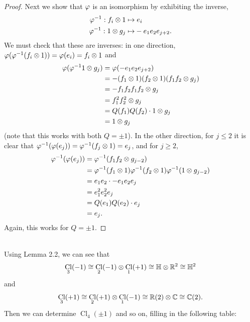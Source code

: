\documentclass{amsart}
\DeclareMathOperator{\Cl}{\mathrm{Cl}}
\begin{document}
\begin{proof}
		Next we show that $\varphi$ is an isomorphism by exhibiting the inverse,
		\begin{align*}
		\varphi^{-1}: f_i\otimes 1 \mapsto& \; e_i\\
		\varphi^{-1}: 1 \otimes g_j \mapsto& -e_1e_2e_{j+2}.
		\end{align*}
		We must check that these are inverses: in one direction, $\varphi(\varphi^{-1}(f_i\otimes 1)) = \varphi(e_i) = f_i\otimes 1$ and
\begin{align*}
	\varphi(\varphi^{-1} 1\otimes g_j) &= \varphi(-e_1e_2e_{j+2})\\
	&= -(f_1\otimes 1)(f_2\otimes 1)(f_1f_2\otimes g_j)\\
	&= -f_1f_2f_1f_2\otimes g_j\\
	&= f_1^2f_2^2 \otimes g_j\\
	&= Q(f_1)Q(f_2) \cdot 1\otimes g_j\\
	&= 1\otimes g_j
\end{align*}
		(note that this works with both $Q=\pm 1$). In the other direction, for $j\leq 2$ it is clear that $\varphi^{-1}(\varphi(e_j))=\varphi^{-1}(f_j\otimes 1) = e_j$, and for $j\geq 2$,
		\begin{align*}
		\varphi^{-1}(\varphi(e_j)) &= \varphi^{-1}(f_1f_2\otimes g_{j-2})\\
		&= \varphi^{-1}(f_1\otimes 1)\varphi^{-1}(f_2\otimes 1)\varphi^{-1}(1\otimes g_{j-2})\\
		&= e_1e_2\cdot -e_1e_2e_j\\
		&= e_1^2e_2^2e_j\\
		&= Q(e_1)Q(e_2)\cdot e_j\\
		&= e_j.
		\end{align*}
		Again, this works for $Q=\pm 1$.
	\end{proof}\\
	
	Using Lemma 2.2, we can see that 
	$$
	\Cl_3(-1) \cong \Cl_2(-1)\otimes \Cl_1(+1) \cong \HH\otimes \R^2 \cong \HH^2 
	$$
	and 
	$$
	\Cl_3(+1) \cong \Cl_2(+1)\otimes \Cl_1(-1) \cong \R(2)\otimes \C \cong \C(2).
	$$
	Then we can determine $\Cl_4(\pm 1)$ and so on, filling in the following table:
	
\end{document}
